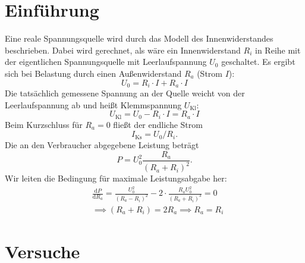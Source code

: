 \section{Einführung}
Eine reale Spannungsquelle wird durch das Modell des Innenwiderstandes beschrieben. Dabei wird gerechnet, als wäre ein Innenwiderstand $R_i$ in Reihe mit der eigentlichen Spannungsquelle mit Leerlaufspannung $U_0$ geschaltet. Es ergibt sich bei Belastung durch einen Außenwiderstand $R_a$ (Strom $I$):
\begin{equation}
  U_0=R_i\cdot I+R_a\cdot I
  \label{eq:innenwiderstand}
\end{equation}
Die tatsächlich gemessene Spannung an der Quelle weicht von der Leerlaufspannung ab und heißt Klemmspannung $U_{\text{Kl}}$:
\begin{equation}
  U_{\text{Kl}}=U_0-R_i\cdot I=R_a\cdot I
  \label{eq:klemmspannung}
\end{equation}
Beim Kurzschluss für $R_a=0$ fließt der endliche Strom
\begin{equation}
  I_{\text{Ks}}=U_0/R_i.
  \label{eq:kurzschluss}
\end{equation}
Die an den Verbraucher abgegebene Leistung beträgt
\begin{equation}
  P=U_0^2 \frac{R_a}{(R_a+R_i)^2}.
  \label{eq:leistung}
\end{equation}
Wir leiten die Bedingung für maximale Leistungsabgabe her:
\begin{align}
  &\frac{\mathrm{d}P}{\mathrm{d}R_a}=\frac{U_0^2}{(R_a-R_i)^2}-2\cdot \frac{R_a U_0^2}{(R_a+R_i)^3}=0 \\
  &\implies (R_a+R_i)=2R_a \implies R_a=R_i
  \label{eq:maxleistung}
\end{align}

\section{Versuche}
